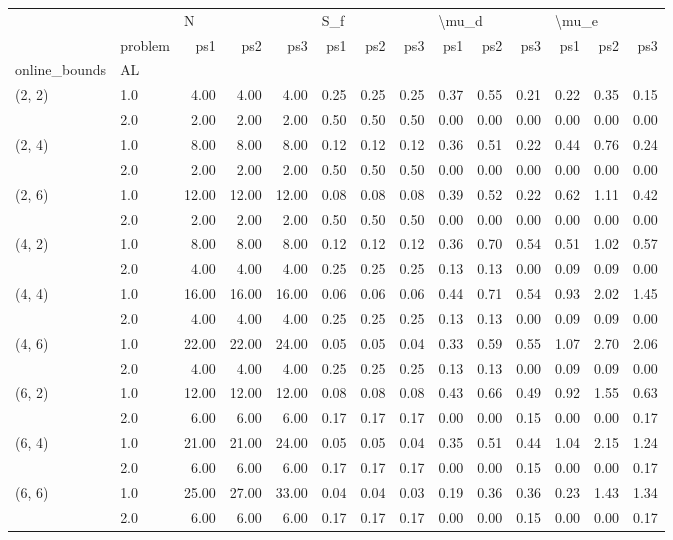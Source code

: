 \begin{tabular}{llrrrrrrrrrrrr}
\toprule
       & {} & \multicolumn{3}{l}{N} & \multicolumn{3}{l}{S\_f} & \multicolumn{3}{l}{\textbackslash mu\_d} & \multicolumn{3}{l}{\textbackslash mu\_e} \\
       & problem &   ps1 &   ps2 &   ps3 &  ps1 &  ps2 &  ps3 &   ps1 &  ps2 &  ps3 &   ps1 &  ps2 &  ps3 \\
online\_bounds & AL &       &       &       &      &      &      &       &      &      &       &      &      \\
\midrule
(2, 2) & 1.0 &  4.00 &  4.00 &  4.00 & 0.25 & 0.25 & 0.25 &  0.37 & 0.55 & 0.21 &  0.22 & 0.35 & 0.15 \\
       & 2.0 &  2.00 &  2.00 &  2.00 & 0.50 & 0.50 & 0.50 &  0.00 & 0.00 & 0.00 &  0.00 & 0.00 & 0.00 \\
(2, 4) & 1.0 &  8.00 &  8.00 &  8.00 & 0.12 & 0.12 & 0.12 &  0.36 & 0.51 & 0.22 &  0.44 & 0.76 & 0.24 \\
       & 2.0 &  2.00 &  2.00 &  2.00 & 0.50 & 0.50 & 0.50 &  0.00 & 0.00 & 0.00 &  0.00 & 0.00 & 0.00 \\
(2, 6) & 1.0 & 12.00 & 12.00 & 12.00 & 0.08 & 0.08 & 0.08 &  0.39 & 0.52 & 0.22 &  0.62 & 1.11 & 0.42 \\
       & 2.0 &  2.00 &  2.00 &  2.00 & 0.50 & 0.50 & 0.50 &  0.00 & 0.00 & 0.00 &  0.00 & 0.00 & 0.00 \\
(4, 2) & 1.0 &  8.00 &  8.00 &  8.00 & 0.12 & 0.12 & 0.12 &  0.36 & 0.70 & 0.54 &  0.51 & 1.02 & 0.57 \\
       & 2.0 &  4.00 &  4.00 &  4.00 & 0.25 & 0.25 & 0.25 &  0.13 & 0.13 & 0.00 &  0.09 & 0.09 & 0.00 \\
(4, 4) & 1.0 & 16.00 & 16.00 & 16.00 & 0.06 & 0.06 & 0.06 &  0.44 & 0.71 & 0.54 &  0.93 & 2.02 & 1.45 \\
       & 2.0 &  4.00 &  4.00 &  4.00 & 0.25 & 0.25 & 0.25 &  0.13 & 0.13 & 0.00 &  0.09 & 0.09 & 0.00 \\
(4, 6) & 1.0 & 22.00 & 22.00 & 24.00 & 0.05 & 0.05 & 0.04 &  0.33 & 0.59 & 0.55 &  1.07 & 2.70 & 2.06 \\
       & 2.0 &  4.00 &  4.00 &  4.00 & 0.25 & 0.25 & 0.25 &  0.13 & 0.13 & 0.00 &  0.09 & 0.09 & 0.00 \\
(6, 2) & 1.0 & 12.00 & 12.00 & 12.00 & 0.08 & 0.08 & 0.08 &  0.43 & 0.66 & 0.49 &  0.92 & 1.55 & 0.63 \\
       & 2.0 &  6.00 &  6.00 &  6.00 & 0.17 & 0.17 & 0.17 &  0.00 & 0.00 & 0.15 &  0.00 & 0.00 & 0.17 \\
(6, 4) & 1.0 & 21.00 & 21.00 & 24.00 & 0.05 & 0.05 & 0.04 &  0.35 & 0.51 & 0.44 &  1.04 & 2.15 & 1.24 \\
       & 2.0 &  6.00 &  6.00 &  6.00 & 0.17 & 0.17 & 0.17 &  0.00 & 0.00 & 0.15 &  0.00 & 0.00 & 0.17 \\
(6, 6) & 1.0 & 25.00 & 27.00 & 33.00 & 0.04 & 0.04 & 0.03 &  0.19 & 0.36 & 0.36 &  0.23 & 1.43 & 1.34 \\
       & 2.0 &  6.00 &  6.00 &  6.00 & 0.17 & 0.17 & 0.17 &  0.00 & 0.00 & 0.15 &  0.00 & 0.00 & 0.17 \\
\bottomrule
\end{tabular}
